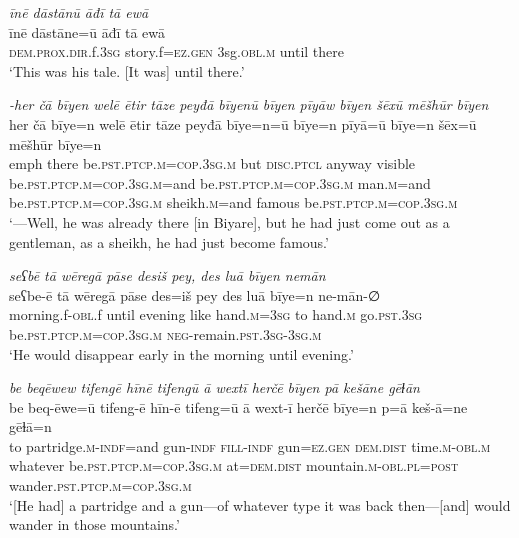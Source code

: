 \ea \label{BP.212}
\textit{īnē dāstānū āđī tā ewā} \\ 
\gll īnē dāstāne=ū āđī tā ewā \\ 
 \textsc{dem.prox}\textsc{.dir}.f\textsc{.3sg} story.f\textsc{=ez.gen} 3sg\textsc{.obl}\textsc{.m} until there \\ 
\glt `This was his tale. [It was] until there.'
\z 
 

\ea \label{ŠJ.5}
\textit{-her čā bīyen welē ētir tāze peyđā bīyenū bīyen pīyāw bīyen šēxū mēšhūr bīyen} \\ 
\gll her čā bīye=n welē ētir tāze peyđā bīye=n=ū bīye=n pīyā=ū bīye=n šēx=ū mēšhūr bīye=n \\ 
 emph there be\textsc{.pst}\textsc{.ptcp}\textsc{.m}\textsc{=cop}\textsc{.3sg}\textsc{.m} but \textsc{disc.ptcl} anyway visible be\textsc{.pst}\textsc{.ptcp}\textsc{.m}\textsc{=cop}\textsc{.3sg}\textsc{.m}=and be\textsc{.pst}\textsc{.ptcp}\textsc{.m}\textsc{=cop}\textsc{.3sg}\textsc{.m} man\textsc{.m}=and be\textsc{.pst}\textsc{.ptcp}\textsc{.m}\textsc{=cop}\textsc{.3sg}\textsc{.m} sheikh\textsc{.m}=and famous be\textsc{.pst}\textsc{.ptcp}\textsc{.m}\textsc{=cop}\textsc{.3sg}\textsc{.m} \\ 
\glt `—Well, he was already there [in Biyare], but he had just come out as a gentleman, as a sheikh, he had just become famous.'
\z 
 
\ea \label{ŠJ.6}
\textit{seʕbē tā wēregā pāse desiš pey, des luā bīyen nemān} \\ 
\gll seʕbe-ē tā wēregā pāse des=iš pey des luā bīye=n ne-mān-∅ \\ 
 morning.f\textsc{-obl}.f until evening like hand\textsc{.m}\textsc{=3sg} to hand\textsc{.m} go\textsc{.pst}\textsc{.3sg} be\textsc{.pst}\textsc{.ptcp}\textsc{.m}\textsc{=cop}\textsc{.3sg}\textsc{.m} \textsc{neg-}remain\textsc{.pst}\textsc{.3sg}\textsc{-3sg}\textsc{.m} \\ 
\glt `He would disappear early in the morning until evening.'
\z 
 
\ea \label{ŠJ.7}
\textit{be beqēwew tifengē hīnē tifengū ā wextī herčē bīyen pā kešāne gēɫān} \\ 
\gll be beq-ēwe=ū tifeng-ē hīn-ē tifeng=ū ā wext-ī herčē bīye=n p=ā keš-ā=ne gēɫā=n \\ 
 to partridge\textsc{.m}\textsc{-indf}=and gun\textsc{-indf} \textsc{fill}\textsc{-indf} gun\textsc{=ez.gen} \textsc{dem.dist} time\textsc{.m}\textsc{-obl}\textsc{.m} whatever be\textsc{.pst}\textsc{.ptcp}\textsc{.m}\textsc{=cop}\textsc{.3sg}\textsc{.m} at=\textsc{dem.dist} mountain\textsc{.m}\textsc{-obl}\textsc{.pl}\textsc{=\textsc{post}} wander\textsc{.pst}\textsc{.ptcp}\textsc{.m}\textsc{=cop}\textsc{.3sg}\textsc{.m} \\ 
\glt `[He had] a partridge and a gun—of whatever type it was back then—[and] would wander in those mountains.'
\z 
 
